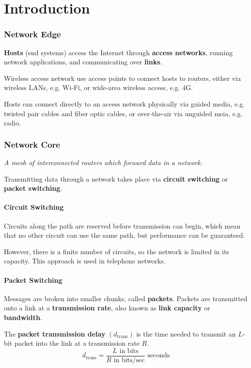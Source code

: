 \part{Introduction}

\section{Network Edge}
\textbf{Hosts} (end systems) access the Internet through \textbf{access networks}, running network applications,
and communicating over \textbf{links}.

Wireless access network use access points to connect hosts to routers, either via wireless LANs, e.g. Wi-Fi,
or wide-area wireless access, e.g. 4G.

Hosts can connect directly to an access network physically via guided media, e.g. twisted pair cables and fiber optic cables,
or over-the-air via unguided meia, e.g. radio.

\section{Network Core}
\emph{A mesh of interconnected routers which forward data in a network.}

Transmitting data through a network takes place via \textbf{circuit switching} or \textbf{packet switching}.

\subsection{Circuit Switching}
Circuits along the path are reserved before transmission can begin, which mean that
no other circuit can use the same path, but performance can be guaranteed.

However, there is a finite number of circuits, so the network is limited in its capacity.
This approach is used in telephone networks.

\subsection{Packet Switching}
Messages are broken into smaller chunks, called \textbf{packets}.
Packets are transmitted onto a link at a \textbf{transmission rate}, also known as \textbf{link capacity} or \textbf{bandwidth}.

The \textbf{packet transmission delay} $\left(d_{\text{trans}}\right)$ is the time needed to transmit an $L$-bit packet into the link 
at a transmission rate $R$.\\
\begin{equation*}
    d_{\text{trans}} = \frac{L \text{ in bits}}{R \text{ in bits/sec}} \text{ seconds}
\end{equation*}


